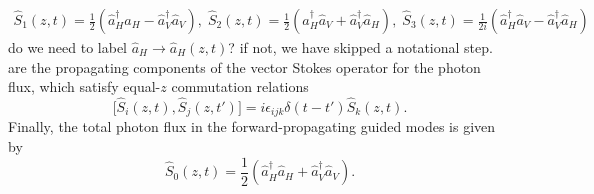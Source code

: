 \documentclass[preprint,aps,pra,onecolumn]{revtex4-1} %
\newcommand{\comment}[1]{{\color{Maroon} #1}}
\begin{document}
\begin{align}
\hat{S}_1(z,t) = \frac{1}{2}\left(\hat{a}^\dag_H \hat{a}_H-\hat{a}^\dag_V \hat{a}_V \right), \; \hat{S}_2(z,t) = \frac{1}{2}\left(\hat{a}^\dag_H \hat{a}_V+\hat{a}^\dag_V \hat{a}_H \right), \; \hat{S}_3(z,t) = \frac{1}{2i}\left(\hat{a}^\dag_H \hat{a}_V-\hat{a}^\dag_V \hat{a}_H \right) 
\end{align}
\comment{ do we need to label $\hat{a}_H \rightarrow \hat{a}_H(z,t)$? if not, we have skipped a notational step.} are the propagating components of the vector Stokes operator for the photon flux, which satisfy equal-$z$ commutation relations
\begin{equation}
\big[\hat{S}_i(z,t), \hat{S}_j(z,t')\big] =i \epsilon_{ijk} \delta(t-t')  \hat{S}_k(z,t).
\end{equation}
Finally, the total photon flux in the forward-propagating guided modes is given by
\begin{equation}
\hat{S}_0(z,t) = \frac{1}{2}\left(\hat{a}^\dag_H \hat{a}_H+\hat{a}^\dag_V \hat{a}_V \right).
\end{equation}
\end{document}
